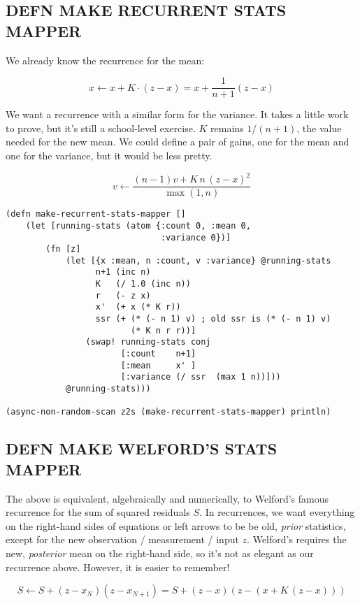 \documentclass[10pt,oneside,x11names]{article}
\begin{document}
\subsection{DEFN MAKE RECURRENT STATS MAPPER}
\label{recurrent-variance}
We already know the recurrence for the mean:

$$x\leftarrow{x+K\cdot(z-x)=x+\frac{1}{n+1}(z-x)}$$

We want a recurrence with a similar form for the variance. It takes a
little work to prove, but it's still a school-level exercise. \(K\)
remains \(1/(n+1)\), the value needed for the new mean. We could define a
pair of gains, one for the mean and one for the variance, but it would
be less pretty.

$$v\leftarrow\frac{\left(n-1\right)v+K\,n\,\left(z-x\right)^2}{\max(1,n)}$$

\begin{verbatim}
(defn make-recurrent-stats-mapper []
    (let [running-stats (atom {:count 0, :mean 0,
                               :variance 0})]
        (fn [z]
            (let [{x :mean, n :count, v :variance} @running-stats
                  n+1 (inc n)
                  K   (/ 1.0 (inc n))
                  r   (- z x)
                  x'  (+ x (* K r))
                  ssr (+ (* (- n 1) v) ; old ssr is (* (- n 1) v)
                         (* K n r r))]
                (swap! running-stats conj
                       [:count    n+1]
                       [:mean     x' ]
                       [:variance (/ ssr  (max 1 n))]))
            @running-stats)))

(async-non-random-scan z2s (make-recurrent-stats-mapper) println)
\end{verbatim}

\subsection{DEFN MAKE WELFORD'S STATS MAPPER}
\label{welfords-variance}
The above is equivalent, algebraically and numerically, to Welford's
famous recurrence for the sum of squared residuals \(S\). In recurrences,
we want everything on the right-hand sides of equations or left arrows
to be be old, \emph{prior} statistics, except for the new observation /
measurement / input \(z\). Welford's requires the new, \emph{posterior} mean on
the right-hand side, so it's not as elegant as our recurrence above.
However, it is easier to remember!

$$S\leftarrow{S} + \left(z-x_N\right)\left(z-x_{N+1}\right)=S+\left(z-x\right)\left(z-\left(x+K\,\left(z-x\right)\right)\right)$$
\end{document}
